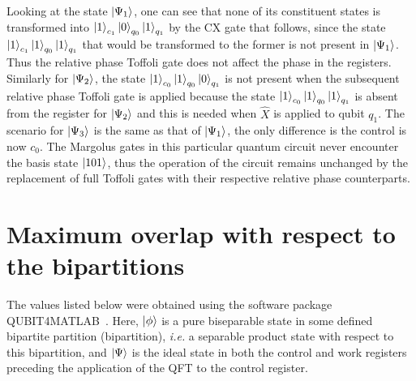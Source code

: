 \noindent
Looking at the state $\ket{\Psi_1}$, one can see that none of its constituent states is transformed into $\ket{1}_{c_1}\ket{0}_{q_0}\ket{1}_{q_1}$ by the CX gate that follows, since the state $\ket{1}_{c_1}\ket{1}_{q_0}\ket{1}_{q_1}$ that would be transformed to the former is not present in $\ket{\Psi_1}$. Thus the relative phase Toffoli gate does not affect the phase in the registers. Similarly for $\ket{\Psi_2}$, the state $\ket{1}_{c_0}\ket{1}_{q_0}\ket{0}_{q_1}$ is not present when the subsequent relative phase Toffoli gate is applied because the state $\ket{1}_{c_0}\ket{1}_{q_0}\ket{1}_{q_1}$ is absent from the register for $\ket{\Psi_2}$ and this is needed when $\hat{X}$ is applied to qubit $q_1$. The scenario for $\ket{\Psi_3}$ is the same as that of $\ket{\Psi_1}$, the only difference is the control is now $c_0$. The Margolus gates in this particular quantum circuit never encounter the basis state $\ket{101}$, thus the operation of the circuit remains unchanged by the replacement of full Toffoli gates with their respective relative phase counterparts.

\clearpage
\section{Maximum overlap with respect to the bipartitions}

The values listed below were obtained using the software package QUBIT4MATLAB~\cite{Toth_2008}. Here, $\ket{\phi}$ is a pure biseparable state in some defined bipartite partition (bipartition), \emph{i.e.} a separable product state with respect to this bipartition, and $\ket{\Psi}$ is the ideal state in both the control and work registers preceding the application of the QFT to the control register.

